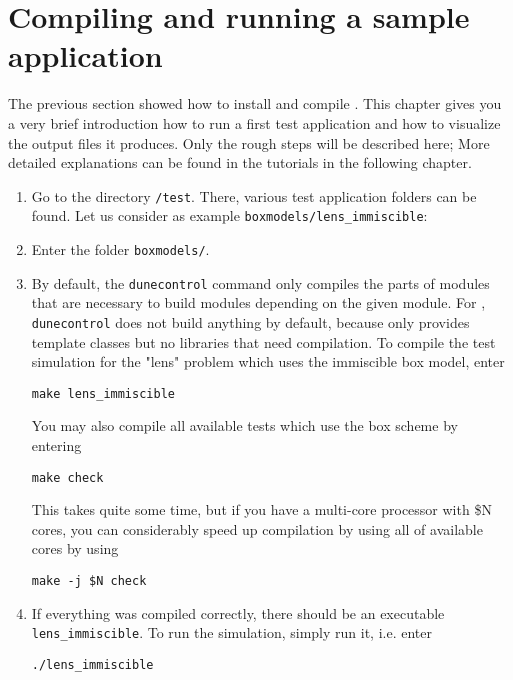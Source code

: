 \section[Quick start guide]{Compiling and running a sample application}
\label{quick-start-guide}

The previous section showed how to install and compile \eWoms. This
chapter gives you a very brief introduction how to run a first test
application and how to visualize the output files it produces. Only the
rough steps will be described here; More detailed explanations can be
found in the tutorials in the following chapter.

\begin{enumerate}
\item Go to the directory \texttt{/test}. There, various test
  application folders can be found. Let us consider as example
  \texttt{boxmodels/lens{\_}immiscible}:
\item Enter the folder \texttt{boxmodels/}. 
\item By default, the \texttt{dunecontrol} command only compiles the
  parts of \Dune modules that are necessary to build modules depending
  on the given module. For \eWoms, \texttt{dunecontrol} does not build
  anything by default, because \eWoms only provides \Cplusplus
  template classes but no libraries that need compilation. To compile
  the test simulation for the "lens" problem which uses the immiscible
  box model, enter
\begin{lstlisting}[style=Bash]
make lens_immiscible
\end{lstlisting}

You may also compile all available tests which use the box scheme by entering
\begin{lstlisting}[style=Bash]
make check
\end{lstlisting}

This takes quite some time, but if you have a multi-core processor
with \$N cores, you can considerably speed up compilation by using all
of available cores by using
\begin{lstlisting}[style=Bash]
make -j $N check
\end{lstlisting}

\item If everything was compiled correctly, there should be an
  executable \texttt{lens{\_}immiscible}. To run the simulation,
  simply run it, i.e. enter
\begin{lstlisting}[style=Bash]
./lens_immiscible
\end{lstlisting}


\end{enumerate}
